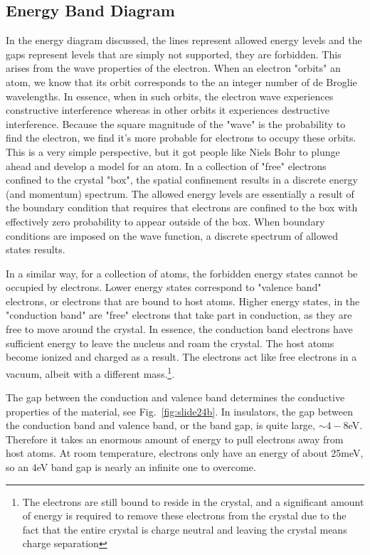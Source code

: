 \subsection{Energy Band Diagram}


In the energy diagram discussed, the lines represent allowed energy levels and the gaps represent levels that are simply not supported, they are forbidden.  This arises from the wave properties of the electron.  When an electron "orbits" an atom, we know that its orbit corresponds to the an integer number of de Broglie wavelengths.  In essence, when in such orbits, the electron wave experiences constructive interference whereas in other orbits it experiences destructive interference.  Because the square magnitude of the "wave" is the probability to find the electron, we find it's more probable for electrons to occupy these orbits.  This is a very simple perspective, but it got people like Niels Bohr to plunge ahead and develop a model for an atom.   In a collection of "free" electrons confined to the crystal "box", the spatial confinement results in a discrete energy (and momentum) spectrum.  The allowed energy levels are essentially a result of the boundary condition that requires that electrons are confined to the box with effectively zero probability to appear outside of the box.  When boundary conditions are imposed on the wave function, a discrete spectrum of allowed states results. 


In a similar way, for a collection of atoms, the forbidden energy states cannot be occupied by electrons.    Lower energy states correspond to "valence band" electrons, or electrons that are bound to host atoms.  Higher energy states, in the "conduction band" are "free" electrons that take part in conduction, as they are free to move around the crystal.  In essence, the conduction band electrons have sufficient energy to leave the nucleus and roam the crystal.  The host atoms become ionized and charged as a result.   The electrons act like free electrons in a vacuum, albeit with a different mass.\footnote{The electrons are still bound to reside in the crystal, and a significant amount of energy is required to remove these electrons from the crystal due to the fact that the entire crystal is charge neutral and leaving the crystal means charge separation}. 


The gap between the conduction and valence band determines the conductive properties of the material, see Fig.~\ref{fig:slide24b}.  In insulators, the gap between the conduction band and  valence band, or the band gap, is quite large,  $\sim 4-8$eV.  Therefore it takes an enormous amount of energy to pull electrons away from host atoms.  At room temperature, electrons only have an energy of about 25meV, so an $4$eV band gap is nearly an infinite one to overcome. 


